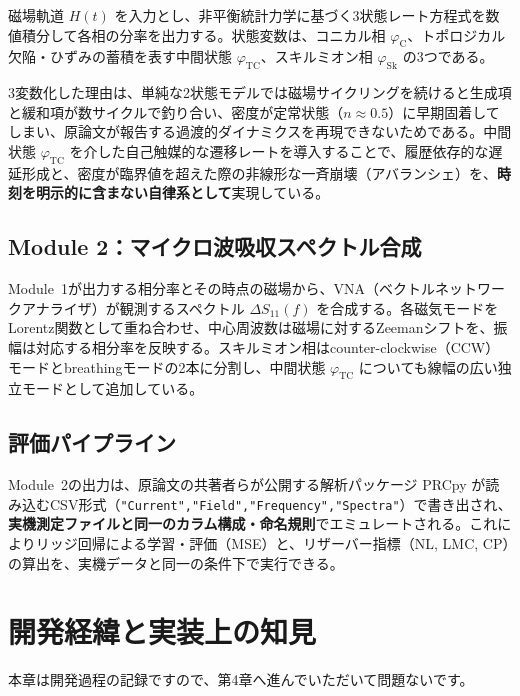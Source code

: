 \documentclass[11pt,a4paper]{ltjsarticle}
\begin{document}
磁場軌道 $H(t)$ を入力とし、非平衡統計力学に基づく3状態レート方程式を数値積分して各相の分率を出力する。状態変数は、コニカル相 $\varphi_\mathrm{C}$、トポロジカル欠陥・ひずみの蓄積を表す中間状態 $\varphi_\mathrm{TC}$、スキルミオン相 $\varphi_\mathrm{Sk}$ の3つである。

3変数化した理由は、単純な2状態モデルでは磁場サイクリングを続けると生成項と緩和項が数サイクルで釣り合い、密度が定常状態（$n\approx0.5$）に早期固着してしまい、原論文が報告する過渡的ダイナミクスを再現できないためである。中間状態 $\varphi_\mathrm{TC}$ を介した自己触媒的な遷移レートを導入することで、履歴依存的な遅延形成と、密度が臨界値を超えた際の非線形な一斉崩壊（アバランシェ）を、\textbf{時刻を明示的に含まない自律系として}実現している。

\subsection{Module 2：マイクロ波吸収スペクトル合成}

Module~1が出力する相分率とその時点の磁場から、VNA（ベクトルネットワークアナライザ）が観測するスペクトル $\Delta S_{11}(f)$ を合成する。各磁気モードをLorentz関数として重ね合わせ、中心周波数は磁場に対するZeemanシフトを、振幅は対応する相分率を反映する。スキルミオン相はcounter-clockwise（CCW）モードとbreathingモードの2本に分割し、中間状態 $\varphi_\mathrm{TC}$ についても線幅の広い独立モードとして追加している。

\subsection{評価パイプライン}

Module~2の出力は、原論文の共著者らが公開する解析パッケージ PRCpy\cite{prcpy} が読み込むCSV形式（\texttt{"Current","Field","Frequency","Spectra"}）で書き出され、\textbf{実機測定ファイルと同一のカラム構成・命名規則}でエミュレートされる。これによりリッジ回帰による学習・評価（MSE）と、リザーバー指標（NL, LMC, CP）の算出を、実機データと同一の条件下で実行できる。

\section{開発経緯と実装上の知見}\label{sec:dev}

\begin{notebox}
本章は開発過程の記録ですので、第4章へ進んでいただいて問題ないです。
\end{notebox}
\end{document}
